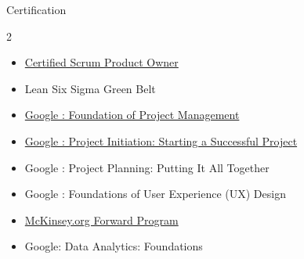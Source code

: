 \documentclass{resume} %
\begin{document}
\vspace{0.5em}
\begin{rSection}{Certification}
\setlength{\columnsep}{2em}
\begin{multicols}{2}
\begin{itemize}[left=-1.5em, labelwidth=.1cm, itemsep=0.0em]
\item \href{https://drive.google.com/file/d/1W_00yFKzw16QAXMxebXWl7uEZn83txCp/view?usp=sharing}{Certified Scrum Product Owner}
\item Lean Six Sigma Green Belt
\item \href{https://www.coursera.org/account/accomplishments/verify/AZCR52ERTR6U}{Google : Foundation of Project Management}
\item \href{https://www.coursera.org/account/accomplishments/verify/MP9MVNTL7E0B}{Google : Project Initiation: Starting a Successful Project}
\item Google : Project Planning: Putting It All Together 
\item Google : Foundations of User Experience (UX) Design
\item \href{https://www.credly.com/badges/dcc70b37-2ad0-4a2e-a5c1-55894dfd8acf/linked_in_profile}{McKinsey.org Forward Program}
\item Google: Data Analytics: Foundations

\end{itemize}
\end{multicols}
\end{rSection}
\vspace{0.5 em}
\end{document}
